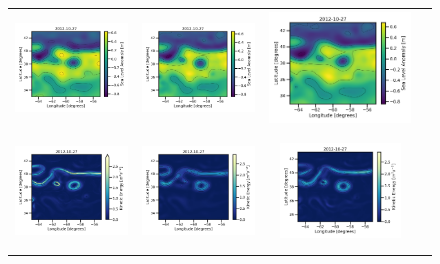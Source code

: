 \begin{figure}[H]
\begin{center}
{\begin{tabular}{cccc}
\includegraphics[trim={0 0 42mm 0},clip, width=3.2cm,height=3cm]{00_Oceanbench/content/figures/maps/sla/dc20a_miost_sla.png} &
\includegraphics[trim={0 0 42mm 0},clip, width=3.2cm,height=3cm]{00_Oceanbench/content/figures/maps/sla/dc20a_bfnqg_sla.png} &
\includegraphics[width=4.0cm,height=3cm]{00_Oceanbench/content/figures/maps/sla/dc20a_4dvarnet_sla.png} \\
\vspace{-2mm}
\includegraphics[trim={0 0 42mm 0},clip, width=3.20cm,height=3cm]{00_Oceanbench/content/figures/maps/ke/dc20a/nadir4/dc20a_nemo_ke.png} &
\includegraphics[trim={0 0 42mm 0},clip, width=3.2cm,height=3cm]{00_Oceanbench/content/figures/maps/ke/dc20a/nadir4/dc20a_miost_ke.png} &
\includegraphics[trim={0 0 42mm 0},clip, width=3.2cm,height=3cm]{00_Oceanbench/content/figures/maps/ke/dc20a/nadir4/dc20a_bfnqg_ke.png} &

\end{tabular}}
\end{center}
\end{figure}
